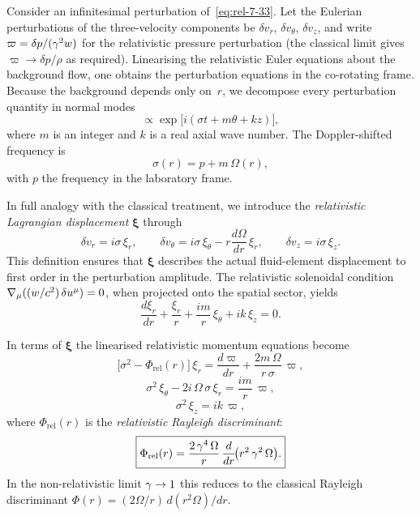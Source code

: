 Consider an infinitesimal perturbation of~\eqref{eq:rel-7-33}.
Let the Eulerian perturbations of the three-velocity components be
$\delta v_r$, $\delta v_\theta$, $\delta v_z$, and write
$\varpi = \delta p/(\gamma^{2}w)$ for the relativistic
pressure perturbation (the classical limit gives $\varpi\to\delta p/\rho$
as required).  Linearising the relativistic Euler equations about the
background flow, one obtains the perturbation equations in the
co-rotating frame.  Because the background depends only on~$r$,
we decompose every perturbation quantity in normal modes
\begin{equation}
\label{eq:rel-7-39}
\propto \exp\!\bigl[i(\sigma t + m\theta + kz)\bigr],
\end{equation}
where $m$ is an integer and $k$ is a real axial wave number.  The
Doppler-shifted frequency is
\begin{equation}
\label{eq:rel-7-44}
\sigma(r) = p + m\,\Omega(r),
\end{equation}
with $p$ the frequency in the laboratory frame.

In full analogy with the classical treatment, we introduce the
\emph{relativistic Lagrangian displacement} $\boldsymbol{\xi}$ through
\begin{equation}
\label{eq:rel-7-45}
\delta v_r = i\sigma\,\xi_r,\qquad
\delta v_\theta = i\sigma\,\xi_\theta
  - r\frac{d\Omega}{dr}\,\xi_r,\qquad
\delta v_z = i\sigma\,\xi_z.
\end{equation}
This definition ensures that $\boldsymbol{\xi}$ describes the actual
fluid-element displacement to first order in the perturbation
amplitude.  The relativistic solenoidal condition
$\nabla_\mu((w/c^{2})\,\delta u^\mu)=0$, when projected onto the
spatial sector, yields
\begin{equation}
\label{eq:rel-7-46}
\frac{d\xi_r}{dr} + \frac{\xi_r}{r}
+ \frac{im}{r}\,\xi_\theta + ik\,\xi_z = 0.
\end{equation}

In terms of $\boldsymbol{\xi}$ the linearised relativistic momentum
equations become
\begin{equation}
\label{eq:rel-7-47}
\bigl[\sigma^{2}-\Phi_{\mathrm{rel}}(r)\bigr]\,\xi_r
= \frac{d\varpi}{dr}
  + \frac{2m\,\Omega}{r\,\sigma}\,\varpi,
\end{equation}
\begin{equation}
\label{eq:rel-7-48}
\sigma^{2}\,\xi_\theta - 2i\,\Omega\,\sigma\,\xi_r
= \frac{im}{r}\,\varpi,
\end{equation}
\begin{equation}
\label{eq:rel-7-49}
\sigma^{2}\,\xi_z = ik\,\varpi,
\end{equation}
where $\Phi_{\mathrm{rel}}(r)$ is the \emph{relativistic Rayleigh
discriminant}:
\begin{equation}
\label{eq:rel-7-53}
\boxed{%
\Phi_{\mathrm{rel}}(r)
= \frac{2\,\Lf^{4}\,\Omega}{r}\,
  \frac{d}{dr}\!\bigl(r^{2}\,\Lf^{2}\,\Omega\bigr).}
\end{equation}
In the non-relativistic limit $\gamma\to1$ this reduces to the
classical Rayleigh discriminant
$\Phi(r)=(2\Omega/r)\,d(r^{2}\Omega)/dr$.

